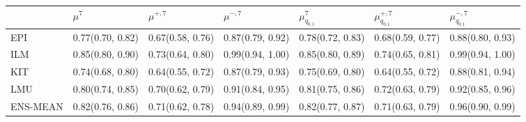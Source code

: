 \begin{tabular}{l p{} p{} p{} p{} p{} p{}}
\toprule
 & $\mu^7$ & $\mu^{+, 7}$ & $\mu^{-, 7}$ & $\mu^7_{q_{0.1}}$ & $\mu^{+, 7}_{q_{0.1}}$ & $\mu^{-, 7}_{q_{0.1}}$ \\
\midrule
EPI & {0.77\newline(0.70, 0.82)} & {0.67\newline(0.58, 0.76)} & {0.87\newline(0.79, 0.92)} & {0.78\newline(0.72, 0.83)} & {0.68\newline(0.59, 0.77)} & {0.88\newline(0.80, 0.93)} \\
ILM & {0.85\newline(0.80, 0.90)} & {0.73\newline(0.64, 0.80)} & {0.99\newline(0.94, 1.00)} & {0.85\newline(0.80, 0.89)} & {0.74\newline(0.65, 0.81)} & {0.99\newline(0.94, 1.00)} \\
KIT & {0.74\newline(0.68, 0.80)} & {0.64\newline(0.55, 0.72)} & {0.87\newline(0.79, 0.93)} & {0.75\newline(0.69, 0.80)} & {0.64\newline(0.55, 0.72)} & {0.88\newline(0.81, 0.94)} \\
LMU & {0.80\newline(0.74, 0.85)} & {0.70\newline(0.62, 0.79)} & {0.91\newline(0.84, 0.95)} & {0.81\newline(0.75, 0.86)} & {0.72\newline(0.63, 0.79)} & {0.92\newline(0.85, 0.96)} \\
ENS-MEAN & {0.82\newline(0.76, 0.86)} & {0.71\newline(0.62, 0.78)} & {0.94\newline(0.89, 0.99)} & {0.82\newline(0.77, 0.87)} & {0.71\newline(0.63, 0.79)} & {0.96\newline(0.90, 0.99)} \\

\end{tabular}
